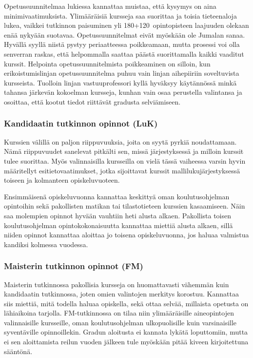 \documentclass[../ala_hataile.tex]{subfiles}
\begin{document}
	Opetussuunnitelmaa lukiessa kannattaa
	muistaa, että kysymys on aina minimivaatimuksista.
	Ylimääräisiä kursseja saa suorittaa
	ja toisia tieteenaloja lukea, vaikkei tutkinnon
	paisuminen yli 180+120~opintopisteen 
	laajuuden olekaan enää nykyään suotavaa. 
	Opetus\-suunnitelmat eivät myöskään ole 
	Jumalan sanaa. Hyvällä syyllä niistä pystyy 
	periaatteessa poikkeamaan, mutta prosessi voi 
	olla senverran raskas, että helpommalla saattaa
	päästä suorittamalla kaikki vaaditut kurssit.
	Helpointa opetus\-suunnitelmista poikkeaminen
	on silloin, kun erikoistumislinjan
	opetus\-suunnitelma puhuu vain linjan
	aihepiiriin soveltuvista kursseista. Tuolloin
	linjan vastuuprofessori kyllä hyväksyy
	käytännössä minkä tahansa järkevän kokoelman
	kursseja, kunhan vain osaa perustella
	valintansa ja osoittaa, että kootut tiedot
	riittävät gradusta selviämiseen.
	
	\subsubsection*{Kandidaatin tutkinnon opinnot (LuK)}
	Kurssien välillä on
	paljon riippuvuuksia, joita on syytä pyrkiä
	noudattamaan. Nämä riippuvuudet sanelevat
	pitkälti sen, missä järjestyksessä ja
	milloin kurssit tulee suorittaa. Myös valinnaisilla
	kursseilla on vielä tässä vaiheessa
	varsin hyvin määritellyt esitietovaatimukset,
	jotka sijoittavat kurssit mallilukujärjestyksessä
	toiseen ja kolmanteen opiskeluvuoteen.
	
	Ensimmäisenä opiskeluvuonna kannattaa
	keskittyä oman koulutusohjelman opintoihin sekä pakollisten matikan tai tilastotieteen kurssien kasaamiseen.
	Näin saa molempien opinnot hyvään
	vauhtiin heti alusta alkaen. Pakollista toisen koulutusohjelman opintokokonaisuutta kannattaa miettiä
	alusta alkaen, sillä niiden opinnot kannattaa
	aloittaa jo toisena opiskeluvuonna, jos haluaa
	valmistua kandiksi kolmessa vuodessa.
	
	\subsubsection*{Maisterin tutkinnon opinnot (FM)}
	Maisterin tutkinnossa pakollisia kursseja
	on huomattavasti vähemmän kuin
	kandidaatin tutkinnossa, joten omien valintojen
	merkitys korostuu. Kannattaa siis
	miettiä, mitä todella haluaa opiskella, sekä
	ottaa selvää, millaista opetusta on lähiaikoina
	tarjolla. FM-tutkinnossa on tilaa niin
	ylimääräisille aineopintojen valinnaisille
	kursseille, oman koulutusohjelman ulkopuolisille
	kuin varsinaisille syventäville opinnoillekin.
	Gradun aloitusta ei kannata lykätä loputtomiin,
	mutta ei sen aloittamista reilun vuoden jälkeen
	tule myöskään pitää kiveen kirjoitettuna
	sääntönä.
	
\end{document}
